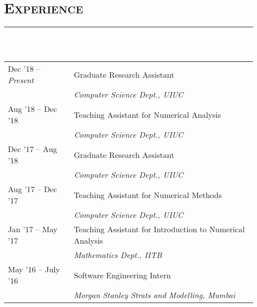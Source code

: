 \documentclass[letterpaper, 12pt]{article}
\begin{document}

\section*{\Large\textsc{Experience}}
\vspace{-4ex}
\rule{\textwidth}{0.1ex}\\
\vspace{1ex}\\
\begin{tabular}{p{} p{}}
Dec '18 -- \textit{Present} &   Graduate Research Assistant \\
                            &   \textit{\small Computer Science Dept., UIUC}\vspace{1ex}\\
Aug '18 -- Dec '18          &   Teaching Assistant for Numerical Analysis\\
                            &   \textit{\small Computer Science Dept., UIUC}\vspace{1ex}\\ 
Dec '17 -- Aug '18          &   Graduate Research Assistant \\
                            &   \textit{\small Computer Science Dept., UIUC}\vspace{1ex}\\
Aug '17 -- Dec '17          &   Teaching Assistant for Numerical Methods\\
                            &   \textit{\small Computer Science Dept., UIUC}\vspace{1ex}\\
Jan '17 -- May '17          &   Teaching Assistant for Introduction to Numerical Analysis\\
                            &   \textit{\small Mathematics Dept., IITB}\vspace{1ex}\\
May '16 -- July '16         &   Software Engineering Intern\\
                            &   \textit{\small Morgan Stanley Strats and Modelling, Mumbai}\\
\end{tabular}



\nocite{*}
\printbibliography[title={\Large\textsc{Publications}\vspace*{-2ex}\\\rule{\textwidth}{0.1ex}},
type=article, resetnumbers=true]
\printbibliography[title={\Large\textsc{Talks}\vspace*{-2ex}\\\rule{\textwidth}{0.1ex}},
type=inproceedings, resetnumbers=true]
\end{document}
